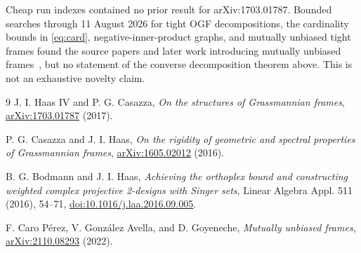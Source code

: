 \documentclass[10pt]{article}
\begin{document}
Cheap run indexes contained no prior result for arXiv:1703.01787.  Bounded
searches through 11 August 2026 for tight OGF decompositions, the cardinality
bounds in \eqref{eq:card}, negative-inner-product graphs, and mutually unbiased tight
frames found the source papers and later work introducing mutually unbiased
frames~\cite{MUF}, but no statement of the converse decomposition theorem
above.  This is not an exhaustive novelty claim.

\begin{thebibliography}{9}
J. I. Haas IV and P. G. Casazza,
\emph{On the structures of Grassmannian frames},
\href{https://arxiv.org/abs/1703.01787}{arXiv:1703.01787} (2017).

P. G. Casazza and J. I. Haas,
\emph{On the rigidity of geometric and spectral properties of Grassmannian frames},
\href{https://arxiv.org/abs/1605.02012}{arXiv:1605.02012} (2016).

B. G. Bodmann and J. I. Haas,
\emph{Achieving the orthoplex bound and constructing weighted complex
projective 2-designs with Singer sets}, Linear Algebra Appl. 511 (2016),
54--71, \href{https://doi.org/10.1016/j.laa.2016.09.005}{doi:10.1016/j.laa.2016.09.005}.

F. Caro P\'erez, V. Gonz\'alez Avella, and D. Goyeneche,
\emph{Mutually unbiased frames},
\href{https://arxiv.org/abs/2110.08293}{arXiv:2110.08293} (2022).
\end{thebibliography}
\end{document}
